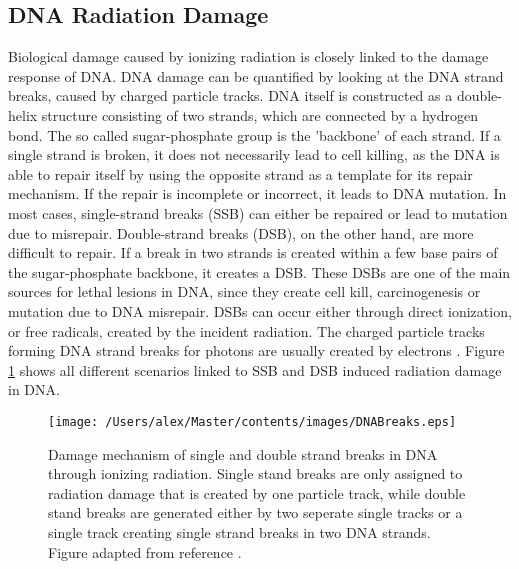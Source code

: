 \subsection{DNA Radiation Damage}
Biological damage caused by ionizing radiation is closely linked to the damage response of DNA. DNA damage can be quantified by looking at the DNA strand breaks, caused by charged particle tracks. DNA itself is constructed as a double-helix structure consisting of two strands, which are connected by a hydrogen bond. The so called sugar-phosphate group is the 'backbone' of each strand. If a single strand is broken, it does not necessarily lead to cell killing, as the DNA is able to repair itself by using the opposite strand as a template for its repair mechanism. If the repair is incomplete or incorrect, it leads to DNA mutation. In most cases, single-strand breaks (SSB) can either be repaired or lead to mutation due to misrepair. Double-strand breaks (DSB), on the other hand, are more difficult to repair. If a break in two strands is created within a few base pairs of the sugar-phosphate backbone, it creates a DSB. These DSBs are one of the main sources for lethal lesions in DNA, since they create cell kill, carcinogenesis or mutation due to DNA misrepair. DSBs can occur either through direct ionization, or free radicals, created by the incident radiation. The charged particle tracks forming DNA strand breaks for photons are usually created by electrons \cite{Alper}. Figure \ref{fig:DNABreaks} shows all different scenarios linked to SSB and DSB induced radiation damage in DNA. 
\begin{figure}[ht]
\centering
\texttt{[image: /Users/alex/Master/contents/images/DNABreaks.eps]}
\caption{Damage mechanism of single and double strand breaks in DNA through ionizing radiation. Single stand breaks are only assigned to radiation damage that is created by one particle track, while double stand breaks are generated either by two seperate single tracks or a single track creating single strand breaks in two DNA strands. Figure adapted from reference \cite{FreseThesis}.}
\label{fig:DNABreaks}
\end{figure}

